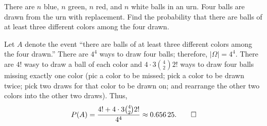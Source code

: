 \begin{problem}[Handout 2, \# 19]
  There are \(n\) blue, \(n\) green, \(n\) red, and \(n\) white balls in an
  urn. Four balls are drawn from the urn with replacement. Find the
  probability that there are balls of at least three different colors among
  the four drawn.
\end{problem}
\begin{solution*}
  Let \(A\) denote the event ``there are balls of at least three different
  colors among the four drawn.'' There are \(4^4\) ways to draw four balls;
  therefore, \(|\Omega|=4^4\). There are \(4!\) wasy to draw a ball of each
  color and \(4\cdot 3\binom{4}{2} 2!\) ways to draw four balls missing
  exactly one color (pic a color to be missed; pick a color to be drawn
  twice; pick two draws for that color to be drawn on; and rearrange the
  other two colors into the other two draws). Thus,
  \[
    P(A)=\frac{4!+4\cdot 3\binom{4}{2}2!}{4^4}\approx\num{0.65625}.\qedhere
  \]
\end{solution*}

